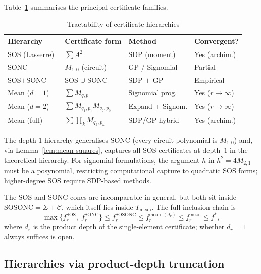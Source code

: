\documentclass{amsart}
\theoremstyle{definition}
\numberwithin{equation}{section}
\begin{document}
Table~\ref{tab:tractability} summarises the principal certificate families.

\begin{table}[htbp]
\centering
\caption{Tractability of certificate hierarchies}
\label{tab:tractability}
\begin{tabular}{@{}llll@{}}
\hline
Hierarchy & Certificate form & Method & Convergent?\\
\hline
SOS (Lasserre)~\cite{JBL01} & $\sum A^2$ & SDP (moment) & Yes (archim.)\\
SONC~\cite{DIdW01} & $M_{1,0}$ (circuit) & GP / Signomial & Partial\\
SOS$+$SONC~\cite{DresslerSchick2025} & SOS $\cup$ SONC & SDP $+$ GP & Empirical\\
\hline
Mean ($d=1$) & $\sum M_{q,p}$ & Signomial prog. & Yes ($r\to\infty$)\\
Mean ($d=2$) & $\sum M_{q_1,p_1}M_{q_2,p_2}$ & Expand + Signom. & Yes ($r\to\infty$)\\
Mean (full) & $\sum\prod_k M_{q_k,p_k}$ & SDP/GP hybrid & Yes (archim.)\\
\hline
\end{tabular}
\end{table}

The depth-$1$ hierarchy generalises SONC (every circuit polynomial is
$M_{1,0}$) and, via Lemma~\ref{lem:mean-squares}, captures all SOS
certificates at depth~$1$ in the theoretical hierarchy.  For signomial
formulations, the argument $h$ in $h^2=4M_{2,1}$ must be a posynomial,
restricting computational capture to quadratic SOS forms; higher-degree SOS
require SDP-based methods.

The SOS and SONC cones are incomparable in general, but both sit inside
$\mathrm{SOSONC}=\Sigma+\mathcal{C}$, which itself lies inside
$T_{\mathrm{mean}}$.  The full inclusion chain is
\begin{equation}\label{eq:hierarchy-chain}
\max\{f^{\mathrm{SOS}}_r,\;f^{\mathrm{SONC}}_r\}
\le f^{\mathrm{SOSONC}}_r
\le f^{\mathrm{mean},(d_r)}_r
\le f^{\mathrm{mean}}_r
\le f^*,
\end{equation}
where $d_r$ is the product depth of the single-element certificate; whether
$d_r=1$ always suffices is open.

\subsection{Hierarchies via product-depth truncation}\label{sec:depth-trunc}
\end{document}
